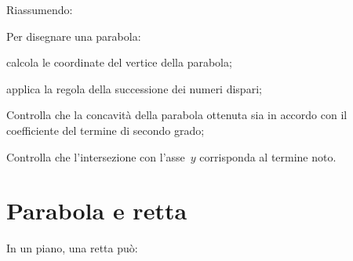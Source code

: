 Riassumendo:
\begin{procedura}
 Per disegnare una parabola:
 \begin{itemize*}
  \item calcola le coordinate del vertice della parabola;
  \item applica la regola della successione dei numeri dispari;
  \item Controlla che la concavità della parabola ottenuta sia in accordo con
   il coefficiente del termine di secondo grado;
  \item Controlla che l'intersezione con l'asse~\(y\) corrisponda al termine 
  noto.
 \end{itemize*}
\end{procedura}


\section{Parabola e retta}
\label{sec:parabola_parabolaretta}

In un piano, una retta può:

